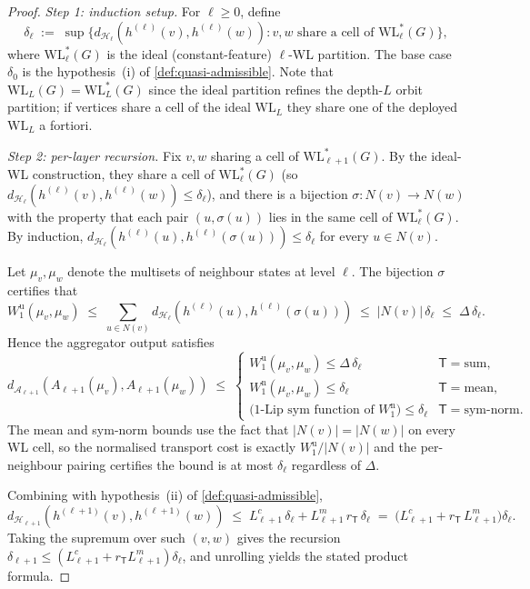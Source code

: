 \documentclass[10pt]{article}
\theoremstyle{definition}
\theoremstyle{remark}
\begin{document}
\begin{proof}
\emph{Step 1: induction setup.} For $\ell \ge 0$, define
\[
  \delta_{\ell}
  \;:=\; \sup\bigl\{ d_{\mathcal{H}_{\ell}}(h^{(\ell)}(v), h^{(\ell)}(w))
    : v, w \text{ share a cell of } \mathrm{WL}_{\ell}^{*}(G) \bigr\},
\]
where $\mathrm{WL}_{\ell}^{*}(G)$ is the ideal (constant-feature)
$\ell$-WL partition. The base case $\delta_{0}$ is the
hypothesis~(i) of \cref{def:quasi-admissible}. Note that
$\mathrm{WL}_{L}(G) = \mathrm{WL}_{L}^{*}(G)$ since the ideal
partition refines the depth-$L$ orbit partition; if vertices
share a cell of the ideal $\mathrm{WL}_{L}$ they share one of
the deployed $\mathrm{WL}_{L}$ a fortiori.

\emph{Step 2: per-layer recursion.} Fix $v, w$ sharing a cell
of $\mathrm{WL}_{\ell+1}^{*}(G)$. By the ideal-WL construction,
they share a cell of $\mathrm{WL}_{\ell}^{*}(G)$ (so
$d_{\mathcal{H}_{\ell}}(h^{(\ell)}(v), h^{(\ell)}(w)) \le \delta_{\ell}$),
and there is a bijection $\sigma : N(v) \to N(w)$ with the
property that each pair $(u, \sigma(u))$ lies in the same cell
of $\mathrm{WL}_{\ell}^{*}(G)$. By induction,
\(
  d_{\mathcal{H}_{\ell}}(h^{(\ell)}(u), h^{(\ell)}(\sigma(u))) \le \delta_{\ell}
\)
for every $u \in N(v)$.

Let $\mu_{v}, \mu_{w}$ denote the multisets of neighbour states
at level $\ell$. The bijection $\sigma$ certifies that
\[
  W_{1}^{\mathrm{u}}(\mu_{v}, \mu_{w})
  \;\le\; \sum_{u \in N(v)}
    d_{\mathcal{H}_{\ell}}(h^{(\ell)}(u), h^{(\ell)}(\sigma(u)))
  \;\le\; |N(v)|\, \delta_{\ell}
  \;\le\; \Delta\, \delta_{\ell}.
\]
Hence the aggregator output satisfies
\[
  d_{\mathcal{A}_{\ell+1}}(A_{\ell+1}(\mu_{v}), A_{\ell+1}(\mu_{w}))
  \;\le\;
  \begin{cases}
    W_{1}^{\mathrm{u}}(\mu_{v}, \mu_{w}) \le \Delta\, \delta_{\ell}
      & \mathsf{T} = \mathrm{sum},\\
    W_{1}^{\mathrm{n}}(\mu_{v}, \mu_{w}) \le \delta_{\ell}
      & \mathsf{T} = \mathrm{mean},\\
    \text{(1-Lip sym function of $W_{1}^{\mathrm{n}}$)} \le \delta_{\ell}
      & \mathsf{T} = \mathrm{sym\text{-}norm}.
  \end{cases}
\]
The mean and sym-norm bounds use the fact that
$|N(v)| = |N(w)|$ on every WL cell, so the normalised
transport cost is exactly $W_{1}^{\mathrm{u}} / |N(v)|$ and the
per-neighbour pairing certifies the bound is at most
$\delta_{\ell}$ regardless of $\Delta$.

Combining with hypothesis~(ii) of \cref{def:quasi-admissible},
\[
  d_{\mathcal{H}_{\ell+1}}(h^{(\ell+1)}(v), h^{(\ell+1)}(w))
  \;\le\; L_{\ell+1}^{c}\, \delta_{\ell}
    + L_{\ell+1}^{m}\, r_{\mathsf{T}}\, \delta_{\ell}
  \;=\; \bigl(L_{\ell+1}^{c} + r_{\mathsf{T}}\, L_{\ell+1}^{m}\bigr) \delta_{\ell}.
\]
Taking the supremum over such $(v, w)$ gives the recursion
$\delta_{\ell+1} \le (L_{\ell+1}^{c} + r_{\mathsf{T}} L_{\ell+1}^{m}) \delta_{\ell}$,
and unrolling yields the stated product formula.


\end{proof}
\end{document}
